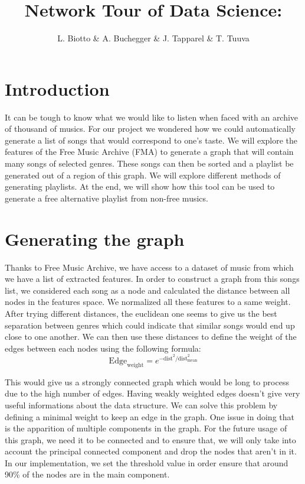 \documentclass[11pt,a4paper,twoside]{article}
\title{\textbf{\huge{Network Tour of Data Science: }}\\\vspace{0.5cm}\normalfont{Free Music Alternative Playlists}}
\author{\LARGE{L. Biotto \& A. Buchegger \& J. Tapparel \& T. Tuuva}}
\date{}
\begin{document}
\maketitle

\section{Introduction}

It can be tough to know what we would like to listen when faced with an archive of thousand of musics. For our project we wondered how we could automatically generate a list of songs that would correspond to one's taste. We will explore the features of the Free Music Archive (FMA) to generate a graph that will contain many songs of selected genres. These songs can then be sorted and a playlist be generated out of a region of this graph. We will explore different methods of generating playlists. At the end, we will show how this tool can be used to generate a free alternative playlist from non-free musics.

\section{Generating the graph}
Thanks to Free Music Archive, we have access to a dataset of music from which we have a list of extracted features. In order to construct a graph from this songs list, we considered each song as a node and calculated the distance between all nodes in the features space. We normalized all these features to a same weight. After trying different distances, the euclidean one seems to give us the best separation between genres which could indicate that similar songs would end up close to one another. We can then use these distances to define the weight of the edges between each nodes using the following formula:
$$
\text{Edge}_{\text{weight}}=e^{-\text{dist}^2/\text{dist}_{\text{mean}}^2}
$$

This would give us a strongly connected graph which would be long to process due to the high number of edges. Having weakly weighted edges doesn't give very useful informations about the data structure. We can solve this problem by defining a minimal weight to keep an edge in the graph. One issue in doing that is the apparition of multiple components in the graph. For the future usage of this graph, we need it to be connected and to ensure that, we will only take into account the principal connected component and drop the nodes that aren't in it. In our implementation, we set the threshold value in order ensure that around 90\% of the nodes are in the main component.\\
\end{document}
